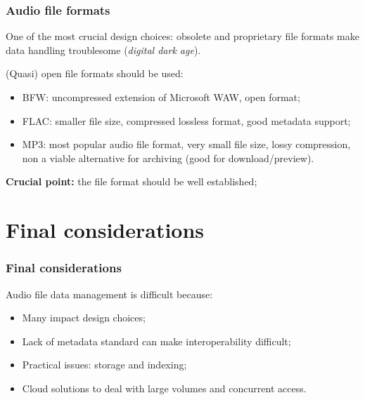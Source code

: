 \documentclass{beamer}
\newcommand\rb[1]{\textcolor{ThemeRed}{\textbf{#1}}}
\begin{document}
  \begin{frame}
    \frametitle{Audio file formats}
    
    One of the most crucial design choices: obsolete and proprietary file formats make data handling troublesome (\textit{digital dark age}).

    \vspace{1em}

    (Quasi) open file formats should be used:

    \vspace{0.5em}

    \begin{itemize}
      \itemsep0.5em
      \item BFW: uncompressed extension of Microsoft WAW, open format;
      \item FLAC: smaller file size, compressed lossless format, good metadata support;
      \item MP3: most popular audio file format, very small file size, lossy compression, non a viable alternative for archiving (good for download/preview).
    \end{itemize}

    \vspace{1em}

    \rb{Crucial point:} the file format should be well established;

  \end{frame}

  

\section{Final considerations}

  \begin{frame}
    \frametitle{Final considerations}
    
    Audio file data management is difficult because:
    
    \vspace{1em}
    
    \begin{itemize}
      \itemsep1em
      \item Many impact design choices;
      \item Lack of metadata standard can make interoperability difficult;
      \item Practical issues: storage and indexing;
      \item Cloud solutions to deal with large volumes and concurrent access.
    \end{itemize}

  \end{frame}


\end{document}
